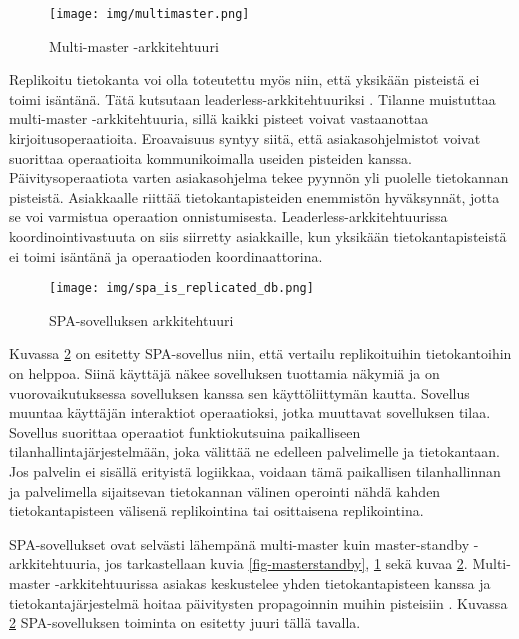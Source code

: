 \documentclass[finnish,twoside,censored,csm,sw-track-2018]{HYthesisML}
\begin{document}
\begin{figure}[ht]
  \centering
    \texttt{[image: img/multimaster.png]}
  \caption{Multi-master -arkkitehtuuri}
  \label{fig-multimaster}
\end{figure}

Replikoitu tietokanta voi olla toteutettu myös niin, että yksikään pisteistä ei toimi isäntänä. Tätä kutsutaan leaderless-arkkitehtuuriksi \cite{Kleppmann}. Tilanne muistuttaa multi-master -arkkitehtuuria, sillä kaikki pisteet voivat vastaanottaa kirjoitusoperaatioita. Eroavaisuus syntyy siitä, että asiakasohjelmistot voivat suorittaa operaatioita kommunikoimalla useiden pisteiden kanssa. Päivitysoperaatiota varten asiakasohjelma tekee pyynnön yli puolelle tietokannan pisteistä. Asiakkaalle riittää tietokantapisteiden enemmistön hyväksynnät, jotta se voi varmistua operaation onnistumisesta. Leaderless-arkkitehtuurissa koordinointivastuuta on siis siirretty asiakkaille, kun yksikään tietokantapisteistä ei toimi isäntänä ja operaatioden koordinaattorina.

\begin{figure}[ht]
  \centering
    \texttt{[image: img/spa\_is\_replicated\_db.png]}
  \caption{SPA-sovelluksen arkkitehtuuri}
  \label{fig-spa-is-replicated}
\end{figure}

Kuvassa \ref{fig-spa-is-replicated} on esitetty SPA-sovellus niin, että vertailu replikoituihin tietokantoihin on helppoa. Siinä käyttäjä näkee sovelluksen tuottamia näkymiä ja on vuorovaikutuksessa sovelluksen kanssa sen käyttöliittymän kautta. Sovellus muuntaa käyttäjän interaktiot operaatioksi, jotka muuttavat sovelluksen tilaa. Sovellus suorittaa operaatiot funktiokutsuina paikalliseen tilanhallintajärjestelmään, joka välittää ne edelleen palvelimelle ja tietokantaan. Jos palvelin ei sisällä erityistä logiikkaa, voidaan tämä paikallisen tilanhallinnan ja palvelimella sijaitsevan tietokannan välinen operointi nähdä kahden tietokantapisteen välisenä replikointina tai osittaisena replikointina.

SPA-sovellukset ovat selvästi lähempänä multi-master kuin master-standby -arkkitehtuuria, jos tarkastellaan kuvia \ref{fig-masterstandby}, \ref{fig-multimaster} sekä kuvaa \ref{fig-spa-is-replicated}. Multi-master -arkkitehtuurissa asiakas keskustelee yhden tietokantapisteen kanssa ja tietokantajärjestelmä hoitaa päivitysten propagoinnin muihin pisteisiin \citep{DSC}. Kuvassa \ref{fig-spa-is-replicated} SPA-sovelluksen toiminta on esitetty juuri tällä tavalla.
\end{document}

